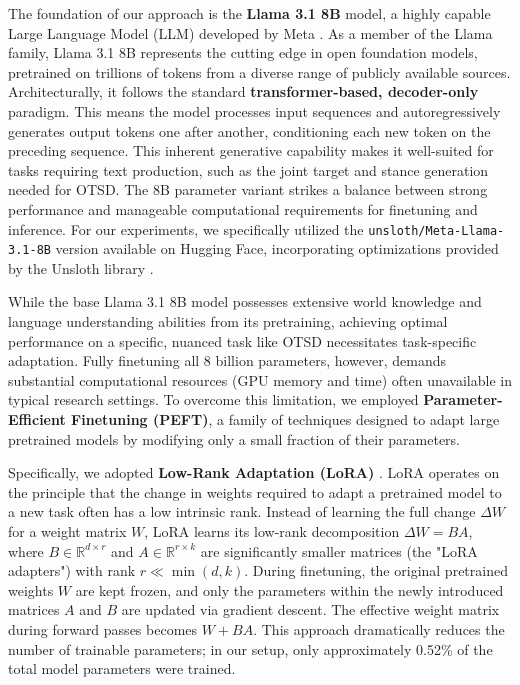 \documentclass[twocolumn,11pt,letterpaper]{article}
\begin{document}
The foundation of our approach is the \textbf{Llama 3.1 8B} model, a highly capable Large Language Model (LLM) developed by Meta \cite{llama3.1}. As a member of the Llama family, Llama 3.1 8B represents the cutting edge in open foundation models, pretrained on trillions of tokens from a diverse range of publicly available sources. Architecturally, it follows the standard \textbf{transformer-based, decoder-only} paradigm. This means the model processes input sequences and autoregressively generates output tokens one after another, conditioning each new token on the preceding sequence. This inherent generative capability makes it well-suited for tasks requiring text production, such as the joint target and stance generation needed for OTSD. The 8B parameter variant strikes a balance between strong performance and manageable computational requirements for finetuning and inference. For our experiments, we specifically utilized the \texttt{unsloth/Meta-Llama-3.1-8B} version available on Hugging Face, incorporating optimizations provided by the Unsloth library \cite{unsloth}.

While the base Llama 3.1 8B model possesses extensive world knowledge and language understanding abilities from its pretraining, achieving optimal performance on a specific, nuanced task like OTSD necessitates task-specific adaptation. Fully finetuning all 8 billion parameters, however, demands substantial computational resources (GPU memory and time) often unavailable in typical research settings. To overcome this limitation, we employed \textbf{Parameter-Efficient Finetuning (PEFT)}, a family of techniques designed to adapt large pretrained models by modifying only a small fraction of their parameters.

Specifically, we adopted \textbf{Low-Rank Adaptation (LoRA)} \cite{lora}. LoRA operates on the principle that the change in weights required to adapt a pretrained model to a new task often has a low intrinsic rank. Instead of learning the full change $\Delta W$ for a weight matrix $W$, LoRA learns its low-rank decomposition $\Delta W = BA$, where $B \in \mathbb{R}^{d \times r}$ and $A \in \mathbb{R}^{r \times k}$ are significantly smaller matrices (the "LoRA adapters") with rank $r \ll \min(d, k)$. During finetuning, the original pretrained weights $W$ are kept frozen, and only the parameters within the newly introduced matrices $A$ and $B$ are updated via gradient descent. The effective weight matrix during forward passes becomes $W + BA$. This approach dramatically reduces the number of trainable parameters; in our setup, only approximately 0.52\% of the total model parameters were trained.
\end{document}
